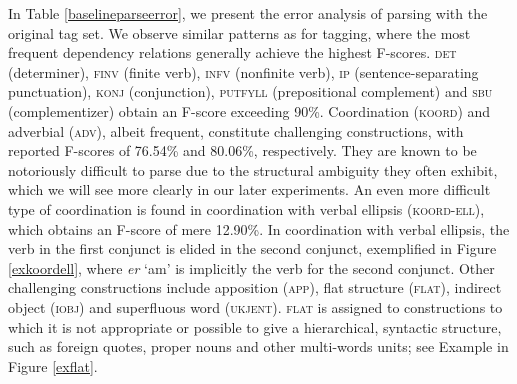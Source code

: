 \documentclass[a4paper,12pt,english]{book}
\begin{document}
In Table \ref{baselineparseerror}, we present the error analysis of parsing
with the original tag set. We observe similar patterns as for tagging, where
the most frequent dependency relations generally achieve the highest F-scores.
\textsc{det} (determiner), \textsc{finv} (finite verb), \textsc{infv}
(nonfinite verb), \textsc{ip} (sentence-separating punctuation), \textsc{konj}
(conjunction), \textsc{putfyll} (prepositional complement) and \textsc{sbu}
(complementizer) obtain an F-score exceeding 90\%.  Coordination
(\textsc{koord}) and adverbial (\textsc{adv}), albeit frequent, constitute
challenging constructions, with reported F-scores of 76.54\% and 80.06\%,
respectively. They are known to be notoriously difficult to parse due to the
structural ambiguity they often exhibit, which we will see more clearly in our
later experiments. An even more difficult type of coordination is found in
coordination with verbal ellipsis (\textsc{koord-ell}), which obtains an
F-score of mere 12.90\%. In coordination with verbal ellipsis, the verb in the
first conjunct is elided in the second conjunct, exemplified in Figure
\ref{exkoordell}, where \emph{er} `am' is implicitly the verb for the second
conjunct.  Other challenging constructions include apposition (\textsc{app}),
flat structure (\textsc{flat}), indirect object (\textsc{iobj}) and superfluous
word (\textsc{ukjent}). \textsc{flat} is assigned to constructions to which it
is not appropriate or possible to give a hierarchical, syntactic structure,
such as foreign quotes, proper nouns and other multi-words units; see Example
in Figure \ref{exflat}.
\end{document}
